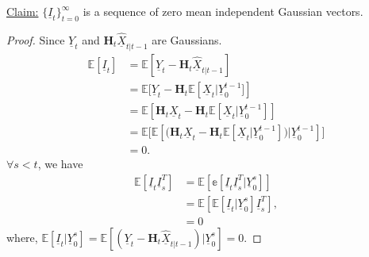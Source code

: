 \documentclass[a4paper,english,12pt]{article}
\begin{document}
\underline{Claim:} $\{\underline{I}_t\}_{t=0}^\infty$ is a sequence of zero mean independent Gaussian vectors.
\begin{proof}
Since $\underline{Y}_t$ and $\textbf{H}_t\underline{\hat{X}}_{t|t-1}$ are Gaussians.
\begin{align*}
 \mathbb{E}[\underline{I}_t]&=\mathbb{E}\left[\underline{Y}_t-\textbf{H}_t\underline{\hat{X}}_{t|t-1}\right]\\
 &=\mathbb{E}[\underline{Y}_t-\textbf{H}_t\mathbb{E}\left[\underline{ X}_{t}|\underline{Y}_0^{t-1}]\right]\\
 &=\mathbb{E}[\textbf{H}_t\underline{X}_t-\textbf{H}_t\mathbb{E}[\underline{X}_t|\underline{Y}_0^{t-1}]]\\
 &=\mathbb{E}\bigg[\mathbb{E}\left[\big(\textbf{H}_t\underline{X}_t-\textbf{H}_t\mathbb{E}[\underline{X}_t|\underline{Y}_0^{t-1}]\big)\bigg|\underline{Y}_0^{t-1}\right]\bigg]\\
 &=0.
\end{align*}
$\forall s<t$, we have
\begin{align*}
\mathbb{E}[\underline{I}_t\underline{I}_s^T]&=\mathbb{E}[\mathbb{e}[\underline{I}_t\underline{I}_s^T|\underline{Y}_0^s]]\\
 &=\mathbb{E}[\mathbb{E}[\underline{I}_t|\underline{Y}_0^s]\underline{I}_s^T],\\
 &=0
\end{align*}
where, $\mathbb{E}[\underline{I}_t|\underline{Y}_0^s]=\mathbb{E}[(\underline{Y}_t-\textbf{H}_t\underline{\hat X}_{t|t-1})|\underline{Y}_0^s]=0$.
\end{proof}
 
\end{document}
